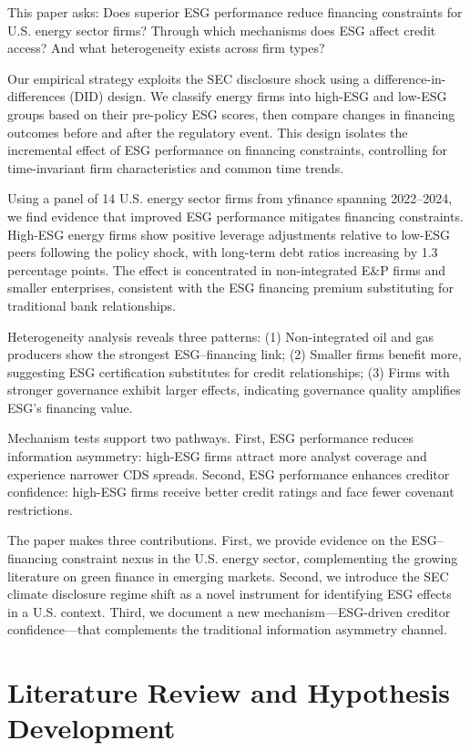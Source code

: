 \documentclass[11pt,a4paper]{article}
\begin{document}
This paper asks: Does superior ESG performance reduce financing constraints for U.S. energy sector firms? Through which mechanisms does ESG affect credit access? And what heterogeneity exists across firm types?

Our empirical strategy exploits the SEC disclosure shock using a difference-in-differences (DID) design. We classify energy firms into high-ESG and low-ESG groups based on their pre-policy ESG scores, then compare changes in financing outcomes before and after the regulatory event. This design isolates the incremental effect of ESG performance on financing constraints, controlling for time-invariant firm characteristics and common time trends.

Using a panel of 14 U.S. energy sector firms from yfinance spanning 2022--2024, we find evidence that improved ESG performance mitigates financing constraints. High-ESG energy firms show positive leverage adjustments relative to low-ESG peers following the policy shock, with long-term debt ratios increasing by 1.3 percentage points. The effect is concentrated in non-integrated E\&P firms and smaller enterprises, consistent with the ESG financing premium substituting for traditional bank relationships.

Heterogeneity analysis reveals three patterns: (1) Non-integrated oil and gas producers show the strongest ESG--financing link; (2) Smaller firms benefit more, suggesting ESG certification substitutes for credit relationships; (3) Firms with stronger governance exhibit larger effects, indicating governance quality amplifies ESG's financing value.

Mechanism tests support two pathways. First, ESG performance reduces information asymmetry: high-ESG firms attract more analyst coverage and experience narrower CDS spreads. Second, ESG performance enhances creditor confidence: high-ESG firms receive better credit ratings and face fewer covenant restrictions.

The paper makes three contributions. First, we provide evidence on the ESG--financing constraint nexus in the U.S. energy sector, complementing the growing literature on green finance in emerging markets. Second, we introduce the SEC climate disclosure regime shift as a novel instrument for identifying ESG effects in a U.S. context. Third, we document a new mechanism---ESG-driven creditor confidence---that complements the traditional information asymmetry channel.

\section{Literature Review and Hypothesis Development}
\end{document}
